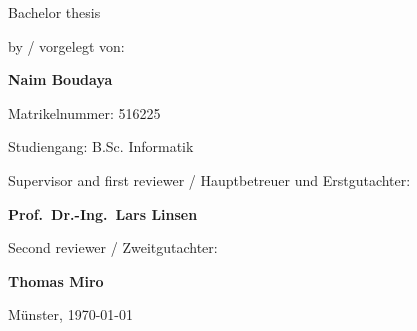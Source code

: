 \begin{centering}
{\large
	Bachelor thesis  \\[2cm]
}

{\large
	by / vorgelegt von:
}

{ \Large
	\textbf{Naim Boudaya}\\[0.5cm]
}

{\large
	Matrikelnummer: 516225\\[2mm]
}

{\large
	Studiengang: B.Sc. Informatik \\[2cm]
}
    
{\large
	Supervisor and first reviewer / Hauptbetreuer und Erstgutachter:
}

{\Large
	\textbf{Prof.~Dr.-Ing.~Lars Linsen}\\[0.5cm]
}

{\large
	Second reviewer / Zweitgutachter:
}

{\Large
	\textbf{Thomas Miro}\\[0.5cm]
}
                               


{\large
Münster, \today \\[1.5cm]
}


\end{centering}